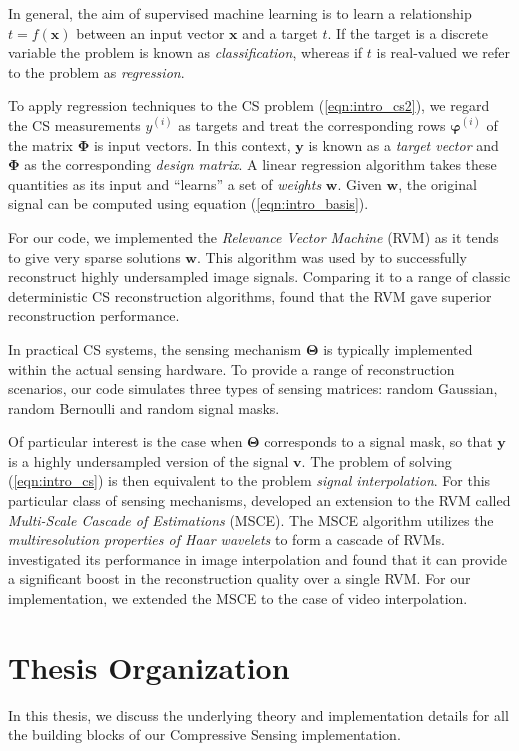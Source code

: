 In general, the aim of supervised machine learning is to learn a relationship $t = f(\bm x)$ between an input vector $\bm x$ and a target $t$.
If the target is a discrete variable the problem is known as \emph{classification}, whereas if $t$ is real-valued we refer to the problem as \emph{regression}.

To apply regression techniques to the CS problem (\ref{eqn:intro_cs2}), we regard the CS measurements $y^{(i)}$ as targets and treat the corresponding rows $\bm\varphi^{(i)}$ of the matrix $\bm\Phi$ is input vectors.
In this context, $\bm y$ is known as a \emph{target vector} and $\bm\Phi$ as the corresponding \emph{design matrix}.
A linear regression algorithm takes these quantities as its input and ``learns'' a set of \emph{weights} $\bm w$.
Given $\bm w$, the original signal can be computed using equation (\ref{eqn:intro_basis}).

For our code, we implemented the \emph{Relevance Vector Machine} (RVM) \cite{tipping2001,tipping2003} as it tends to give very sparse solutions $\bm w$.
This algorithm was used by \cite{pilikos2014} to successfully reconstruct highly undersampled image signals.
Comparing it to a range of classic deterministic CS reconstruction algorithms, \cite{pilikos2014} found that the RVM gave superior reconstruction performance.

In practical CS systems, the sensing mechanism $\bm\Theta$ is typically implemented within the actual sensing hardware.
To provide a range of reconstruction scenarios, our code simulates three types of sensing matrices: random Gaussian, random Bernoulli and random signal masks.

Of particular interest is the case when $\bm\Theta$ corresponds to a signal mask, so that $\bm y$ is a highly undersampled version of the signal $\bm v$.
The problem of solving (\ref{eqn:intro_cs}) is then equivalent to the problem \emph{signal interpolation}.
For this particular class of sensing mechanisms, \cite{pilikos2014} developed an extension to the RVM called \emph{Multi-Scale Cascade of Estimations} (MSCE).
The MSCE algorithm utilizes the \emph{multiresolution properties of Haar wavelets} to form a cascade of RVMs.
\cite{pilikos2014} investigated its performance in image interpolation and found that it can provide a significant boost in the reconstruction quality over a single RVM.
For our implementation, we extended the MSCE to the case of video interpolation.

\section*{Thesis Organization}
In this thesis, we discuss the underlying theory and implementation details for all the building blocks of our Compressive Sensing implementation.

